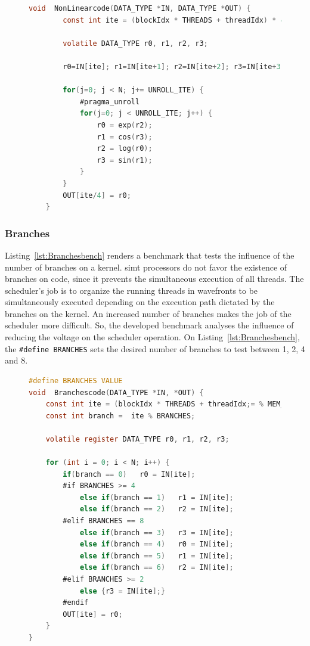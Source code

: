 \begin{figure}[htpb]
    \begin{lstlisting}[language=C, caption=Non-linear Operations Benchmark Code, label=lst:NonLinearbench, basicstyle=\footnotesize\ttfamily, abovecaptionskip=0pt, captionpos=b]
    void  NonLinearcode(DATA_TYPE *IN, DATA_TYPE *OUT) {
        const int ite = (blockIdx * THREADS + threadIdx) * 4;
        
        volatile DATA_TYPE r0, r1, r2, r3;
        
        r0=IN[ite]; r1=IN[ite+1]; r2=IN[ite+2]; r3=IN[ite+3];  
        
        for(j=0; j < N; j+= UNROLL_ITE) {
            #pragma_unroll
            for(j=0; j < UNROLL_ITE; j++) {
                r0 = exp(r2);  
                r1 = cos(r3);
                r2 = log(r0);   
                r3 = sin(r1);
            }
        }
        OUT[ite/4] = r0;
    }
    \end{lstlisting}
\end{figure}

\subsubsection{Branches}

Listing~\ref{lst:Branchesbench} renders a benchmark that tests the influence of the number of branches on a kernel. \acrshort{simt} processors do not favor the existence of branches on code, since it prevents the simultaneous execution of all threads. 
The scheduler's job is to organize the running threads in wavefronts to be simultaneously executed depending on the execution path dictated by the branches on the kernel. An increased number of branches makes the job of the scheduler more difficult. So, the developed benchmark analyses the influence of reducing the voltage on the scheduler operation. On Listing~\ref{lst:Branchesbench}, the \texttt{\#define BRANCHES} sets the desired number of branches to test between 1, 2, 4 and 8.

\begin{figure}[h]
\begin{lstlisting}[language=C, caption=Branches Benchmark Code, label=lst:Branchesbench, basicstyle=\footnotesize\ttfamily,abovecaptionskip=0pt, captionpos=b]
#define BRANCHES VALUE
void  Branchescode(DATA_TYPE *IN, *OUT) {
    const int ite = (blockIdx * THREADS + threadIdx;= % MEM_BLOCK;
    const int branch =  ite % BRANCHES;
    
    volatile register DATA_TYPE r0, r1, r2, r3;
    
    for (int i = 0; i < N; i++) {
        if(branch == 0)   r0 = IN[ite];
        #if BRANCHES >= 4
            else if(branch == 1)   r1 = IN[ite];
            else if(branch == 2)   r2 = IN[ite];
        #elif BRANCHES == 8
            else if(branch == 3)   r3 = IN[ite];
            else if(branch == 4)   r0 = IN[ite];
            else if(branch == 5)   r1 = IN[ite];
            else if(branch == 6)   r2 = IN[ite];
        #elif BRANCHES >= 2
            else {r3 = IN[ite];}
        #endif
        OUT[ite] = r0;
    }
}
\end{lstlisting}
\end{figure}

